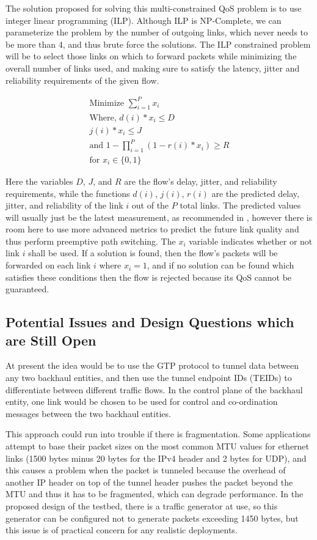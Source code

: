 The solution proposed for solving this multi-constrained QoS problem is to use integer linear programming (ILP). Although ILP is NP-Complete, we can parameterize the problem by the number of outgoing links, which never needs to be more than 4, and thus brute force the solutions. The ILP constrained problem will be to select those links on which to forward packets while minimizing the overall number of links used, and making sure to satisfy the latency, jitter and reliability requirements of the given flow.

\begin{gather}
\text{Minimize } \sum_{i=1}^{P}x_i \\
\text{Where, } d(i) * x_i\le D \\
j(i) * x_i \le J \\
\text{and }1 - \prod_{i=1}^{P}{ ( 1- r(i) * x_i ) } \ge R  \\
\text{for } x_i \in \{0,1\}
\end{gather}

Here the variables $D$, $J$, and $R$ are the flow's delay, jitter, and reliability requirements, while the functions $d(i)$, $j(i)$, $r(i)$ are the predicted delay, jitter, and reliability of the link $i$ out of the $P$ total links. The predicted values will usually just be the latest measurement, as recommended in \cite{akella2008performance}, however there is room here to use more advanced metrics to predict the future link quality and thus perform preemptive path switching. The $x_i$ variable indicates whether or not link $i$ shall be used. If a solution is found, then the flow's packets will be forwarded on each link $i$ where $x_i = 1$, and if no solution can be found which satisfies these conditions then the flow is rejected because its QoS cannot be guaranteed.

\subsection{Potential Issues and Design Questions which are Still Open}

At present the idea would be to use the GTP protocol to tunnel data between any two backhaul entities, and then use the tunnel endpoint IDs (TEIDs) to differentiate between different traffic flows. In the control plane of the backhaul entity, one link would be chosen to be used for control and co-ordination messages between the two backhaul entities.

This approach could run into trouble if there is fragmentation. Some applications attempt to base their packet sizes on the most common MTU values for ethernet links (1500 bytes  minus 20 bytes for the IPv4 header and 2 bytes for UDP), and this causes a problem when the packet is tunneled because the overhead of another IP header on top of the tunnel header pushes the packet beyond the MTU and thus it has to be fragmented, which can degrade performance. In the proposed design of the testbed, there is a traffic generator at use, so this generator can be configured not to  generate packets exceeding 1450 bytes, but this issue is of practical concern for any realistic deployments.

